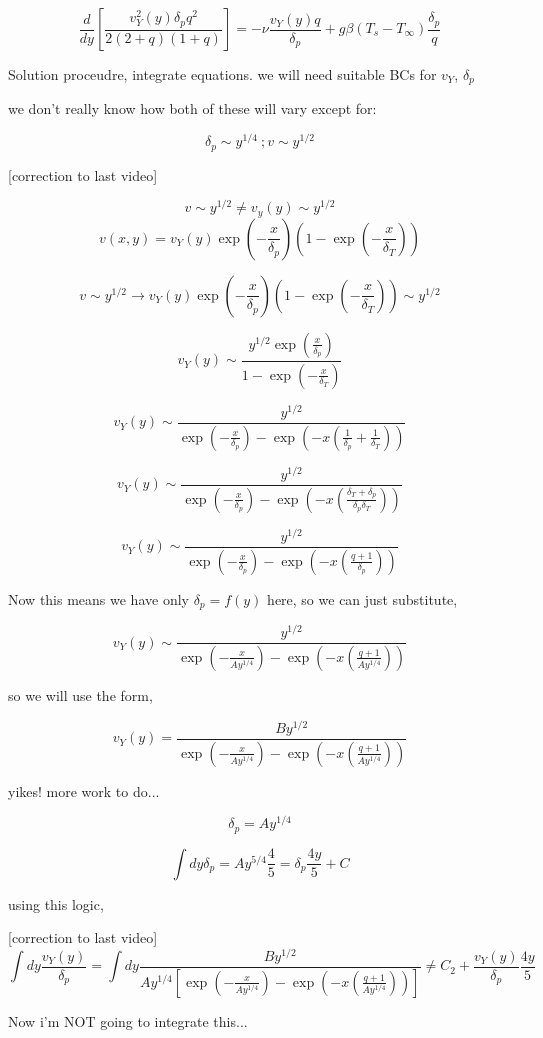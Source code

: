 \documentclass[11pt]{article}
\begin{document}
$$\frac{d}{dy} \left[  \frac{v_Y^2 (y) \delta_p q^2  }{2(2+q)(1+ q)} \right] = - \nu  \frac{ v_Y (y) q}{\delta_p} + g\beta  (T_s -T_\infty) \frac{\delta_p}{q}$$

Solution proceudre, integrate equations. we will need suitable BCs for $v_Y$, $\delta_p$ 

we don't really know how both of these will vary except for:

$$\delta_p \sim y^{1/4} \ ; v \sim y^{1/2}$$

[correction to last video]

$$v\sim y^{1/2} \neq v_y(y) \sim y^{1/2}$$
$$v (x,y) = v_Y (y) \exp (-\frac{x}{\delta_p}) (1- \exp (-\frac{x}{\delta_T}))$$

$$v\sim y^{1/2} \rightarrow v_Y (y) \exp (-\frac{x}{\delta_p}) (1- \exp (-\frac{x}{\delta_T})) \sim y^{1/2}$$

$$v_Y (y) \sim \frac{y^{1/2} \exp (\frac{x}{\delta_p})}{1- \exp (-\frac{x}{\delta_T})}$$

$$v_Y (y) \sim \frac{y^{1/2} }{\exp (-\frac{x}{\delta_p})- \exp (-x (\frac{1}{\delta_p} + \frac{1}{\delta_T} ))}$$

$$v_Y (y) \sim \frac{y^{1/2} }{\exp (-\frac{x}{\delta_p})- \exp (-x (\frac{\delta_T + \delta_p}{\delta_p \delta_T} ))}$$

$$v_Y (y) \sim \frac{y^{1/2} }{\exp (-\frac{x}{\delta_p})- \exp (-x (\frac{q+1}{\delta_p } ))}$$

Now this means we have only $\delta_p =f(y)$ here, so we can just substitute,

 $$v_Y (y) \sim \frac{y^{1/2} }{\exp (-\frac{x}{Ay^{1/4}})- \exp (-x (\frac{q+1}{Ay^{1/4}} ))}$$


so we will use the form,

 $$v_Y (y) =  \frac{B y^{1/2} }{\exp (-\frac{x}{Ay^{1/4}})- \exp (-x (\frac{q+1}{Ay^{1/4}} ))}$$


yikes! more work to do...

$$\delta_p = A y^{1/4}$$

$$\int dy \delta_p = A y^{5/4} \frac{4}{5}= \delta_p \frac{4y}{5}+C$$

using this logic,

[correction to last video]
$$\int dy \frac{v_Y(y)}{\delta_p} =\int dy \frac{B y^{1/2}}{A y^{1/4} [ \exp (-\frac{x}{Ay^{1/4}})- \exp (-x (\frac{q+1}{Ay^{1/4}} ))]} \neq  C_2 + \frac{v_Y(y)}{\delta_p} \frac{4y}{5}$$

Now i'm NOT going to integrate this...
\end{document}
